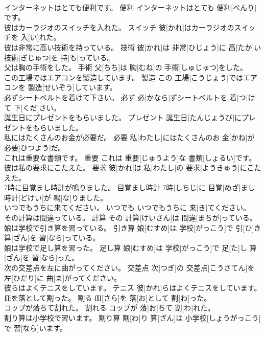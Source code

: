 \documentclass[8pt]{extreport}
\begin{document}
\begin{CJK}{UTF8}{min}
\\	インターネットはとても便利です。	便利	インターネットはとても 便利[べんり]です。	
\\	彼はカーラジオのスイッチを入れた。	スイッチ	彼[かれ]はカーラジオのスイッチを 入[い]れた。	
\\	彼は非常に高い技術を持っている。	技術	彼[かれ]は 非常[ひじょう]に 高[たか]い 技術[ぎじゅつ]を 持[も]っている。	
\\	父は胸の手術をした。	手術	父[ちち]は 胸[むね]の 手術[しゅじゅつ]をした。	
\\	この工場ではエアコンを製造しています。	製造	この 工場[こうじょう]ではエアコンを 製造[せいぞう]しています。	
\\	必ずシートベルトを着けて下さい。	必ず	必[かなら]ずシートベルトを 着[つ]けて 下[くだ]さい。	
\\	誕生日にプレゼントをもらいました。	プレゼント	誕生日[たんじょうび]にプレゼントをもらいました。	
\\	私にはたくさんのお金が必要だ。	必要	私[わたし]にはたくさんのお 金[かね]が 必要[ひつよう]だ。	
\\	これは重要な書類です。	重要	これは 重要[じゅうよう]な 書類[しょるい]です。	
\\	彼は私の要求にこたえた。	要求	彼[かれ]は 私[わたし]の 要求[ようきゅう]にこたえた。	
\\	7時に目覚まし時計が鳴りました。	目覚まし時計	7時[しちじ]に 目覚[めざ]まし 時計[どけい]が 鳴[な]りました。	
\\	いつでもうちに来てください。	いつでも	いつでもうちに 来[き]てください。	
\\	その計算は間違っている。	計算	その 計算[けいさん]は 間違[まちが]っている。	
\\	娘は学校で引き算を習っている。	引き算	娘[むすめ]は 学校[がっこう]で 引[ひ]き 算[ざん]を 習[なら]っている。	
\\	娘は学校で足し算を習った。	足し算	娘[むすめ]は 学校[がっこう]で 足[た]し 算[ざん]を 習[なら]った。	
\\	次の交差点を左に曲がってください。	交差点	次[つぎ]の 交差点[こうさてん]を 左[ひだり]に 曲[ま]がってください。	
\\	彼らはよくテニスをしています。	テニス	彼[かれ]らはよくテニスをしています。	
\\	皿を落として割った。	割る	皿[さら]を 落[お]として 割[わ]った。	
\\	コップが落ちて割れた。	割れる	コップが 落[お]ちて 割[わ]れた。	
\\	割り算は小学校で習います。	割り算	割[わ]り 算[ざん]は 小学校[しょうがっこう]で 習[なら]います。	

\end{CJK}
\end{document}

